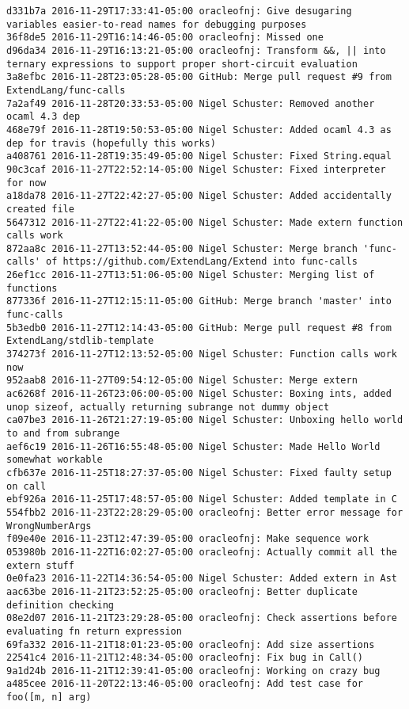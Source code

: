 \begin{lstlisting}
d331b7a 2016-11-29T17:33:41-05:00 oracleofnj: Give desugaring variables easier-to-read names for debugging purposes
36f8de5 2016-11-29T16:14:46-05:00 oracleofnj: Missed one
d96da34 2016-11-29T16:13:21-05:00 oracleofnj: Transform &&, || into ternary expressions to support proper short-circuit evaluation
3a8efbc 2016-11-28T23:05:28-05:00 GitHub: Merge pull request #9 from ExtendLang/func-calls
7a2af49 2016-11-28T20:33:53-05:00 Nigel Schuster: Removed another ocaml 4.3 dep
468e79f 2016-11-28T19:50:53-05:00 Nigel Schuster: Added ocaml 4.3 as dep for travis (hopefully this works)
a408761 2016-11-28T19:35:49-05:00 Nigel Schuster: Fixed String.equal
90c3caf 2016-11-27T22:52:14-05:00 Nigel Schuster: Fixed interpreter for now
a18da78 2016-11-27T22:42:27-05:00 Nigel Schuster: Added accidentally created file
5647312 2016-11-27T22:41:22-05:00 Nigel Schuster: Made extern function calls work
872aa8c 2016-11-27T13:52:44-05:00 Nigel Schuster: Merge branch 'func-calls' of https://github.com/ExtendLang/Extend into func-calls
26ef1cc 2016-11-27T13:51:06-05:00 Nigel Schuster: Merging list of functions
877336f 2016-11-27T12:15:11-05:00 GitHub: Merge branch 'master' into func-calls
5b3edb0 2016-11-27T12:14:43-05:00 GitHub: Merge pull request #8 from ExtendLang/stdlib-template
374273f 2016-11-27T12:13:52-05:00 Nigel Schuster: Function calls work now
952aab8 2016-11-27T09:54:12-05:00 Nigel Schuster: Merge extern
ac6268f 2016-11-26T23:06:00-05:00 Nigel Schuster: Boxing ints, added unop sizeof, actually returning subrange not dummy object
ca07be3 2016-11-26T21:27:19-05:00 Nigel Schuster: Unboxing hello world to and from subrange
aef6c19 2016-11-26T16:55:48-05:00 Nigel Schuster: Made Hello World somewhat workable
cfb637e 2016-11-25T18:27:37-05:00 Nigel Schuster: Fixed faulty setup on call
ebf926a 2016-11-25T17:48:57-05:00 Nigel Schuster: Added template in C
554fbb2 2016-11-23T22:28:29-05:00 oracleofnj: Better error message for WrongNumberArgs
f09e40e 2016-11-23T12:47:39-05:00 oracleofnj: Make sequence work
053980b 2016-11-22T16:02:27-05:00 oracleofnj: Actually commit all the extern stuff
0e0fa23 2016-11-22T14:36:54-05:00 Nigel Schuster: Added extern in Ast
aac63be 2016-11-21T23:52:25-05:00 oracleofnj: Better duplicate definition checking
08e2d07 2016-11-21T23:29:28-05:00 oracleofnj: Check assertions before evaluating fn return expression
69fa332 2016-11-21T18:01:23-05:00 oracleofnj: Add size assertions
22541c4 2016-11-21T12:48:34-05:00 oracleofnj: Fix bug in Call()
9a1d24b 2016-11-21T12:39:41-05:00 oracleofnj: Working on crazy bug
a485cee 2016-11-20T22:13:46-05:00 oracleofnj: Add test case for foo([m, n] arg)

\end{lstlisting}
